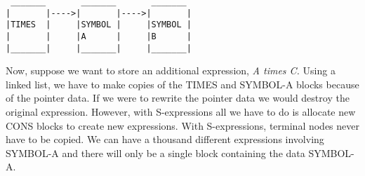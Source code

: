 \begin{verbatim}
 _______       _______       _______
|       |---->|       |---->|       |
|TIMES  |     |SYMBOL |     |SYMBOL |
|       |     |A      |     |B      |
|_______|     |_______|     |_______|
\end{verbatim}

\medskip
\noindent
Now, suppose we want to store an additional expression, {\it A times C.}
Using a linked list, we have to make copies of the TIMES and SYMBOL-A blocks
because of the pointer data.
If we were to rewrite the pointer data we would destroy the original
expression.
However, with S-expressions all we have to do is allocate new CONS
blocks to create new expressions.
With S-expressions, terminal nodes never have to be copied.
We can have a thousand different expressions involving SYMBOL-A and there
will only be a single block containing the data SYMBOL-A.


